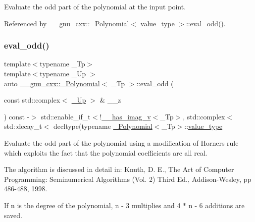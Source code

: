 Evaluate the odd part of the polynomial at the input point. 

Referenced by \+\_\+\+\_\+gnu\+\_\+cxx\+::\+\_\+\+Polynomial$<$ value\+\_\+type $>$\+::eval\+\_\+odd().

\mbox{\label{class____gnu__cxx_1_1__Polynomial_a5348bf4c4db826660a133ab731f775c1}} 
\subsubsection{\texorpdfstring{eval\+\_\+odd()}{eval\_odd()}\hspace{0.1cm}{\footnotesize\ttfamily [3/3]}}
{\footnotesize\ttfamily template$<$typename \+\_\+\+Tp$>$ \\
template$<$typename \+\_\+\+Up $>$ \\
auto \hyperlink{class____gnu__cxx_1_1__Polynomial}{\+\_\+\+\_\+gnu\+\_\+cxx\+::\+\_\+\+Polynomial}$<$ \+\_\+\+Tp $>$\+::eval\+\_\+odd (\begin{DoxyParamCaption}\item[{const std\+::complex$<$ \hyperlink{class____gnu__cxx_1_1__Polynomial_a242114d4b86648a5dff67a8221f80d40}{\+\_\+\+Up} $>$ \&}]{\+\_\+\+\_\+z }\end{DoxyParamCaption}) const -\/$>$ std\+::enable\+\_\+if\+\_\+t$<$!\hyperlink{namespace____gnu__cxx_afa2404a914b06f950f3a46e75aca51a9}{\+\_\+\+\_\+has\+\_\+imag\+\_\+v}$<$\+\_\+\+Tp$>$,
			std\+::complex$<$std\+::decay\+\_\+t$<$
		decltype(typename \hyperlink{class____gnu__cxx_1_1__Polynomial}{\+\_\+\+Polynomial}$<$\+\_\+\+Tp$>$\+::\hyperlink{class____gnu__cxx_1_1__Polynomial_a725563351f50e76084a7a016c06f8a53}{value\+\_\+type}\hspace{0.3cm}{\ttfamily [inline]}}

Evaluate the odd part of the polynomial using a modification of Horner\textquotesingle{}s rule which exploits the fact that the polynomial coefficients are all real.

The algorithm is discussed in detail in\+: Knuth, D. E., The Art of Computer Programming\+: Seminumerical Algorithms (Vol. 2) Third Ed., Addison-\/\+Wesley, pp 486-\/488, 1998.

If n is the degree of the polynomial, n -\/ 3 multiplies and 4 $\ast$ n -\/ 6 additions are saved. 

